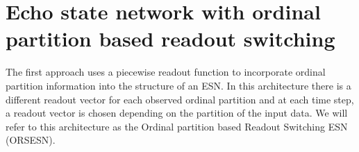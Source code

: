 
\renewcommand{\chapterlabel}{Chapter}
\chapter{Echo state network with ordinal partition based readout switching}
\label{chap:ORSESN}


The first approach uses a piecewise readout function to incorporate ordinal partition information into the structure of an ESN. In this architecture there is a different readout vector for each observed ordinal partition and at each time step, a readout vector is chosen depending on the partition of the input data. We will refer to this architecture as the Ordinal partition based Readout Switching ESN (ORSESN).

        
        

        
        
        
